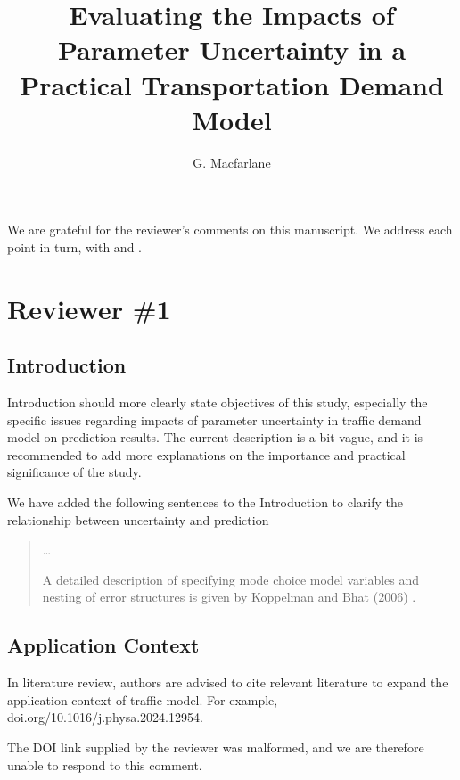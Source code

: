 \documentclass{ar2rc}
\title{Evaluating the Impacts of Parameter Uncertainty in a Practical Transportation Demand Model}
\author{G. Macfarlane}
\begin{document}
\maketitle

We are grateful for the reviewer's comments on this manuscript. We address each point in turn, with 
\DIFaddbegin {}\DIFaddend  and 
\DIFdelbegin {}\DIFdelend.

\section{Reviewer \#1}

\subsection{Introduction}
\RC Introduction should more clearly state objectives of this study, especially
the specific issues regarding impacts of parameter uncertainty in traffic demand
model on prediction results. The current description is a bit vague, and it is
recommended to add more explanations on the importance and practical
significance of the study.

\AR We have added the following sentences to the Introduction to clarify the relationship
between uncertainty and prediction

\begin{quote}
    \DIFaddbegin {}\DIFaddend 

    \ldots

    A detailed description of specifying mode choice model variables and nesting
    of error structures is given by Koppelman and Bhat (2006)\DIFaddbegin
    \DIFaddend .
\end{quote}

\subsection{Application Context}
\RC In literature review, authors are advised to cite relevant literature to
expand the application context of traffic model. For example,
doi.org/10.1016/j.physa.2024.12954.

\AR The DOI link supplied by the reviewer was malformed, and we are therefore
unable to respond to this comment.
\end{document}
